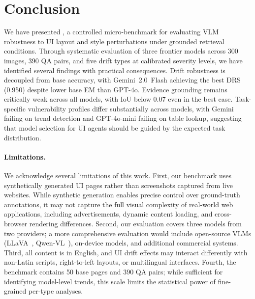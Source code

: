 \section{Conclusion}
\label{sec:conclusion}

We have presented \bench{}, a controlled micro-benchmark for evaluating VLM robustness to UI layout and style perturbations under grounded retrieval conditions. Through systematic evaluation of three frontier models across 300 images, 390 QA pairs, and five drift types at calibrated severity levels, we have identified several findings with practical consequences. Drift robustness is decoupled from base accuracy, with Gemini~2.0~Flash achieving the best DRS (0.950) despite lower base EM than GPT-4o. Evidence grounding remains critically weak across all models, with IoU below 0.07 even in the best case. Task-specific vulnerability profiles differ substantially across models, with Gemini failing on trend detection and GPT-4o-mini failing on table lookup, suggesting that model selection for UI agents should be guided by the expected task distribution.

\paragraph{Limitations.}
We acknowledge several limitations of this work. First, our benchmark uses synthetically generated UI pages rather than screenshots captured from live websites. While synthetic generation enables precise control over ground-truth annotations, it may not capture the full visual complexity of real-world web applications, including advertisements, dynamic content loading, and cross-browser rendering differences. Second, our evaluation covers three models from two providers; a more comprehensive evaluation would include open-source VLMs (LLaVA~\cite{liu2023llava}, Qwen-VL~\cite{bai2023qwenvl}), on-device models, and additional commercial systems. Third, all content is in English, and UI drift effects may interact differently with non-Latin scripts, right-to-left layouts, or multilingual interfaces. Fourth, the benchmark contains 50 base pages and 390 QA pairs; while sufficient for identifying model-level trends, this scale limits the statistical power of fine-grained per-type analyses.

